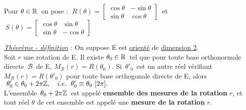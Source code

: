 \vspace{1.5cm}

Pour \(\theta\in \mathbb{R}\,\) on pose : \(\;R(\theta)=\left[
\begin{array}{lr}
    \cos \theta & -\sin \theta \\
    \sin \theta & \cos \theta
\end{array}
 \right]\ \) et \(\ S(\theta)=\left[
\begin{array}{lr}
    \cos \theta & \sin \theta \\
    \sin \theta & -\cos \theta 
\end{array}
\right]\)


\vspace{1.5cm}

\underline{\emph{Théorème - définition}} : On suppose E est \underline{orienté} de \underline{dimension 2}.\vspace{0.1cm}\\
Soit $r$ une rotation de E. Il existe \(\theta_0\in \mathbb{R}\,\) tel que pour toute base orthonormale directe \(\,\mathcal{B}\,\) de E, \(M_\mathcal{B}(r)=R(\theta_0)\). Si \(\,\theta'_0\,\) est un autre réel vérifiant \(M_\mathcal{B}(r)=R(\theta'_0)\) pour toute base orthogonale directe de E, alors \(\ \theta'_0 \in \theta_0 +2\pi \mathbb{Z},\quad i.e.\ \; \theta'_0\equiv \theta_0\ [2\pi] . \)\vspace{0.2cm}\\
L'ensemble \(\,\theta_0+2\pi \mathbb{Z}\,\) est appelé \textbf{ensemble des mesures de la rotation} $r$, et tout réel $\theta$ de cet ensemble est appelé une \textbf{mesure de la rotation} $r$.

\vspace{1.3cm}

